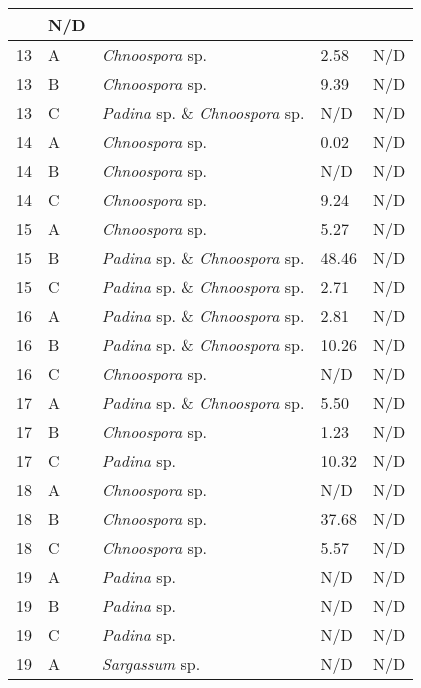 \documentclass[12pt]{article}
\begin{document}
\begin{longtable}{ | p{2cm} | p{2cm} | p{3cm} | p{3.5cm} | p{3.5cm} | }
&N/D\\
\hline
13&A&\emph{Chnoospora} sp.&2.58 %
&N/D\\
\hline
13&B&\emph{Chnoospora} sp.&9.39
&N/D\\
\hline
13&C&\emph{Padina} sp. \& \emph{Chnoospora} sp.&N/D&N/D\\
\hline
14&A&\emph{Chnoospora }sp.&0.02
&N/D\\
\hline
14&B&\emph{Chnoospora} sp.&N/D&N/D\\
\hline
14&C&\emph{Chnoospora }sp.&9.24
&N/D\\
\hline
15&A&\emph{Chnoospora }sp.&5.27
&N/D\\
\hline
15&B&\emph{Padina} sp. \& \emph{Chnoospora} sp.&48.46
&N/D\\
\hline
15&C&\emph{Padina} sp. \& \emph{Chnoospora }sp.&2.71
&N/D\\
\hline
16&A&\emph{Padina} sp. \& \emph{Chnoospora }sp.&2.81
&N/D\\
\hline
16&B&\emph{Padina} sp. \& \emph{Chnoospora }sp.&10.26
&N/D\\
\hline
16&C&\emph{Chnoospora }sp.&N/D&N/D\\
\hline
17&A&\emph{Padina} sp. \& \emph{Chnoospora} sp.&5.50
&N/D\\
\hline
17&B&\emph{Chnoospora }sp.&1.23
&N/D\\
\hline
17&C&\emph{Padina} sp.&10.32
&N/D\\
\hline
18&A&\emph{Chnoospora }sp.&N/D&N/D\\
\hline
18&B&\emph{Chnoospora} sp.&37.68
&N/D\\
\hline
18&C&\emph{Chnoospora} sp.&5.57
&N/D\\
\hline
19&A&\emph{Padina} sp.&N/D&N/D\\%
\hline
19&B&\emph{Padina} sp.&N/D&N/D\\
\hline
19&C&\emph{Padina} sp.&N/D&N/D\\
\hline
19
&A&\emph{Sargassum} sp.&N/D&N/D\\

\end{longtable}
\end{document}
